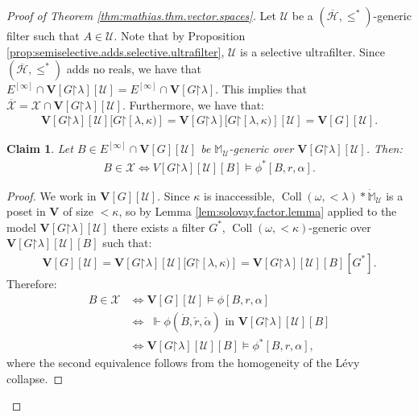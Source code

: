 \documentclass[11pt,reqno]{amsart}
\theoremstyle{plain}
\numberwithin{equation}{section}
\newtheorem{claim}{Claim}
\theoremstyle{definition}
\newcommand{\func}{\operatorname}
\renewcommand{\bar}[1]{\overline{#1}}
\newcommand{\cal}{\mathcal}
\renewcommand{\bf}{\mathbf}
\newcommand{\forces}{\Vdash}
\newcommand{\restrictedto}{\mathord{\upharpoonright}}
\newcommand{\Coll}{\func{Coll}}
\newcommand{\U}{\cal{U}}
\newcommand{\V}{\bf{V}}
\newcommand{\X}{\cal{X}}
\renewcommand{\H}{\cal{H}}
\newenvironment{midproof}[1][Proof]
  {\begin{proof}[#1]\renewcommand{\qedsymbol}{$\blacksquare$}}
  {\end{proof}}
\begin{document}
\begin{proof}[Proof of Theorem \ref{thm:mathias.thm.vector.spaces}]
    Let $\U$ be a $(\bar{\H},\leq^*)$-generic filter such that $A \in \U$. Note that by Proposition \ref{prop:semiselective.adds.selective.ultrafilter}, $\U$ is a selective ultrafilter. Since $(\bar{\H},\leq^*)$ adds no reals, we have that $E^{[\infty]} \cap \V[G\restrictedto\lambda][\U] = E^{[\infty]} \cap \V[G\restrictedto\lambda]$. This implies that $\bar{\X} = \X \cap \V[G\restrictedto\lambda][\U]$. Furthermore, we have that:
    \begin{align*}
        \V[G\restrictedto\lambda][\U][G\restrictedto[\lambda,\kappa)] = \V[G\restrictedto\lambda][G\restrictedto[\lambda,\kappa)][\U] = \V[G][\U].
    \end{align*}

    \begin{claim}
        Let $B \in E^{[\infty]} \cap \V[G][\U]$ be $\mathbb{M}_\U$-generic over $\V[G\restrictedto\lambda][\U]$. Then:
        \begin{align*}
            B \in \X \iff V[G\restrictedto\lambda][\U][B] \models \phi^*[B,r,\alpha].
        \end{align*}
    \end{claim}

    \begin{midproof}
        We work in $\V[G][\U]$. Since $\kappa$ is inaccessible, $\Coll(\omega,<\!\lambda) * \dot{\mathbb{M}}_\U$ is a poset in $\V$ of size $<\!\kappa$, so by Lemma \ref{lem:solovay.factor.lemma} applied to the model $\V[G\restrictedto\lambda][\U]$ there exists a filter $G^*$, $\Coll(\omega,<\!\kappa)$-generic over $\V[G\restrictedto\lambda][\U][B]$ such that:
        \begin{align*}
            \V[G][\U] = \V[G\restrictedto\lambda][\U][G\restrictedto[\lambda,\kappa)] = \V[G\restrictedto\lambda][\U][B][G^*].
        \end{align*}
        Therefore:
        \begin{align*}
            B \in \X &\iff \V[G][\U] \models \phi[B,r,\alpha] \\
            &\iff \;\forces \phi(\dot{B},\check{r},\check{\alpha}) \text{ in $\V[G\restrictedto\lambda][\U][B]$} \\
            &\iff \V[G\restrictedto\lambda][\U][B] \models \phi^*[B,r,\alpha],
        \end{align*}
        where the second equivalence follows from the homogeneity of the L\'{e}vy collapse.
    \end{midproof}
    

\end{proof}
\end{document}
